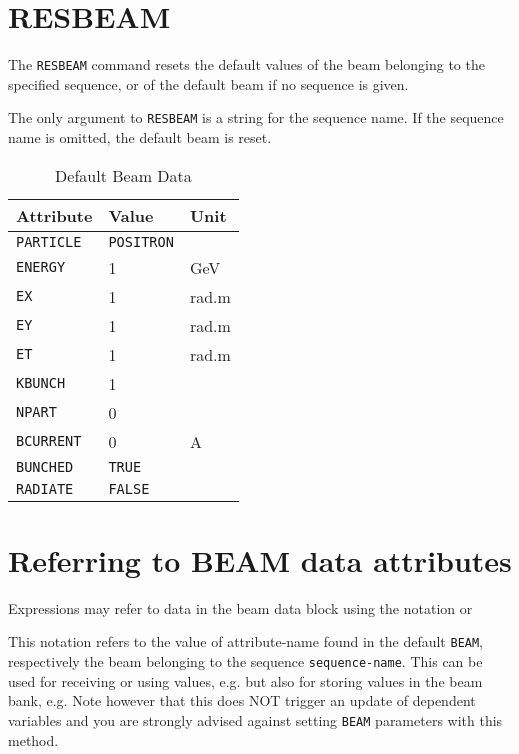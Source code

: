 \section{RESBEAM}
\label{sec:resbeam}

The \texttt{RESBEAM} command resets the default values of the beam belonging to
the specified sequence, or of the default beam if no sequence is given.  


The only argument to \texttt{RESBEAM} is a string for the sequence name.
If the sequence name is omitted, the default beam is reset. 

\begin{table}[h]
  \caption{Default Beam Data}
  \vspace{1ex}
  \centering
  \begin{tabular}{|l|l|l|}
    \hline
    \textbf{Attribute}   &  \textbf{Value} & \textbf{Unit}  \\
    \hline
    \texttt{PARTICLE} &  \texttt{POSITRON} & \\
    \texttt{ENERGY}   &  1           & GeV \\
    \texttt{EX}       &  1           & rad.m \\
    \texttt{EY}       &  1           & rad.m \\
    \texttt{ET}       &  1           & rad.m \\
    \texttt{KBUNCH}   &  1           & \\
    \texttt{NPART}    &  0           & \\
    \texttt{BCURRENT} &  0           & A \\
    \texttt{BUNCHED}  &  \texttt{TRUE}  & \\
    \texttt{RADIATE}  &  \texttt{FALSE} & \\     
    \hline
  \end{tabular}
\end{table}


\section{Referring to BEAM data attributes}
 
Expressions may refer to data in the beam data block using the
notation  
or 

This notation refers to the value of attribute-name found in the default
\texttt{BEAM}, respectively the beam belonging to the sequence
\texttt{sequence-name}.  
This can be used for receiving or using values, e.g. 
but also for storing values in the beam bank, e.g.  
Note however that this does NOT trigger an update of dependent variables
and you are strongly advised against setting \texttt{BEAM} parameters
with this method.

